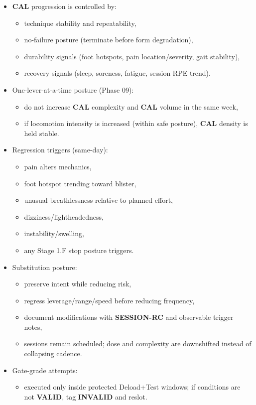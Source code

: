 \documentclass[10pt]{article}
\begin{document}
\begin{landscape}
\begin{itemize}
\item \textbf{CAL} progression is controlled by:
  \begin{itemize}
  \item technique stability and repeatability,
  \item no-failure posture (terminate before form degradation),
  \item durability signals (foot hotspots, pain location/severity, gait stability),
  \item recovery signals (sleep, soreness, fatigue, session RPE trend).
  \end{itemize}
\item One-lever-at-a-time posture (Phase 09):
  \begin{itemize}
  \item do not increase \textbf{CAL} complexity and \textbf{CAL} volume in the same week,
  \item if locomotion intensity is increased (within safe posture), \textbf{CAL} density is held stable.
  \end{itemize}
\item Regression triggers (same-day):
  \begin{itemize}
  \item pain alters mechanics,
  \item foot hotspot trending toward blister,
  \item unusual breathlessness relative to planned effort,
  \item dizziness/lightheadedness,
  \item instability/swelling,
  \item any Stage 1.F stop posture triggers.
  \end{itemize}
\item Substitution posture:
  \begin{itemize}
  \item preserve intent while reducing risk,
  \item regress leverage/range/speed before reducing frequency,
  \item document modifications with \textbf{SESSION-RC} and observable trigger notes,
  \item sessions remain scheduled; dose and complexity are downshifted instead of collapsing cadence.
  \end{itemize}
\item Gate-grade attempts:
  \begin{itemize}
  \item executed only inside protected Deload+Test windows; if conditions are not \textbf{VALID}, tag \textbf{INVALID} and reslot.
  \end{itemize}
\end{itemize}


\end{landscape}
\end{document}
